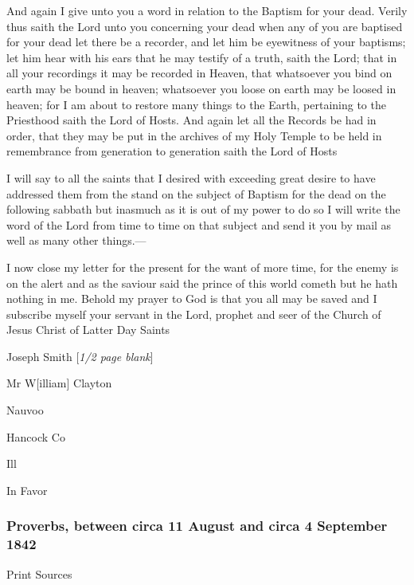				And again I give unto you a word in relation to the Baptism for your dead. Verily thus saith the Lord unto you concerning your dead when any of you are baptised for your dead let there be a recorder, and let him be eyewitness of your baptisms; let him hear with his ears that he may testify of a truth, saith the Lord; that in all your recordings it may be recorded in Heaven, that whatsoever you bind on earth may be bound in heaven; whatsoever you loose on earth may be loosed in heaven; for I am about to restore many things to the Earth, pertaining to the Priesthood saith the Lord of Hosts. And again let all the Records be had in order, that they may be put in the archives of my Holy Temple to be held in remembrance from generation to generation saith the Lord of Hosts

				I will say to all the saints that I desired with exceeding great desire to have addressed them from the stand on the subject of Baptism for the dead on the following sabbath but inasmuch as it is out of my power to do so I will write the word of the Lord from time to time on that subject and send it you by mail as well as many other things.---

				I now close my letter for the present for the want of more time, for the enemy is on the alert and as the saviour said the prince of this world cometh but he hath nothing in me. Behold my prayer to God is that you all may be saved and I subscribe myself your servant in the Lord, prophet and seer of the Church of Jesus Christ of Latter Day Saints

				Joseph Smith [\textit{1/2 page blank}]

				Mr W[illiam] Clayton

				Nauvoo

				Hancock Co

				Ill

				In Favor
				
		\subsubsection{Proverbs, between circa 11 August and circa 4 September 1842}
			\label{EMS-1842-JS-CIR-11-AUG-CIR-4-SEP-1842}
		
			\begin{description}
				\item[Print Sources]
			\end{description}

